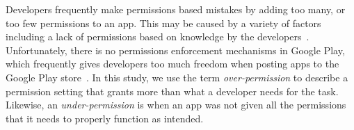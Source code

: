 \documentclass{sig-alternate-05-2015}
\begin{document}
Developers frequently make permissions based mistakes by adding too many, or too few permissions to an app. This may be caused by a variety of factors including a lack of permissions based on knowledge by the developers~\cite{6624000}. Unfortunately, there is no permissions enforcement mechanisms in Google Play, which frequently gives developers too much freedom when posting apps to the Google Play store~\cite{Barrera:2012:UIA:2381934.2381949}. In this study, we use the term \emph{over-permission} to describe a permission setting that grants more than what a developer needs for the task. Likewise, an \emph{under-permission} is when an app was not given all the permissions that it needs to properly function as intended.








\end{document}
